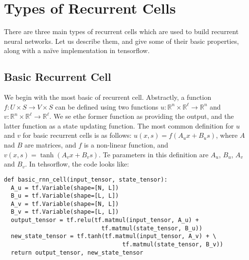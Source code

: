 \documentclass[10pt]{amsart}
\newcommand{\R}{\mathbb{R}}
\theoremstyle{definition}
\begin{document}
\section{Types of Recurrent Cells}

There are three main types of recurrent cells which are used to build recurrent neural networks.  Let us describe them, and give some of their basic properties, along with a na\"ive implementation in tensorflow.

\subsection{Basic Recurrent Cell} We begin with the most basic of recurrent cell. Abstractly, a function $f:U\times S\to V\times S$ can be defined using two functions $u:\R^n\times \R^\ell\to \R^n$ and $v:\R^n\times\R^\ell \to \R^\ell$. We se ethe former function as providing the output, and the latter function as a state updating function.  The most common definition for $u$ and $v$ for basic recurrent cells is as follows: $u(x, s) = f(A_ux+B_us)$, where $A$ nad $B$ are matrices, and $f$ is a non-linear function, and $v(x, s) = \tanh(A_vx+B_vs)$. Te parameters in this definition are $A_u$, $B_u$, $A_v$ and $B_v$. In tehsorflow, the code looks like:

\begin{verbatim}
def basic_rnn_cell(input_tensor, state_tensor):
  A_u = tf.Variable(shape=[N, L])
  B_u = tf.Variable(shape=[L, L])
  A_v = tf.Variable(shape=[N, L])
  B_v = tf.Variable(shape=[L, L])
  output_tensor = tf.relu(tf.matmul(input_tensor, A_u) +
                            tf.matmul(state_tensor, B_u))
  new_state_tensor = tf.tanh(tf.matmul(input_tensor, A_v) + \
                                  tf.matmul(state_tensor, B_v))
  return output_tensor, new_state_tensor
\end{verbatim}
\end{document}

